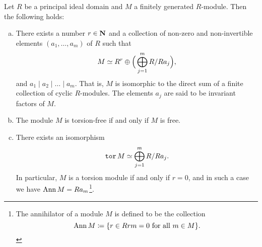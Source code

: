 \begin{theorem}
    \label{thm:fundamental-theorem-of-invariant-factors}
    Let \(R\) be a principal ideal domain and \(M\) a finitely generated
    \(R\)-module. Then the following holds:
    \begin{enumerate}[(a)]\setlength\itemsep{0em}
        \item There exists a number \(r \in \mathbf{N}\) and a collection of non-zero and
              non-invertible elements \((a_1, \dots, a_m)\) of \(R\) such that
              \[
                  M \simeq R^r \oplus \Big( \bigoplus_{j=1}^m R/R a_j \Big),
              \]
              and \(a_1 \mid a_2 \mid \dots \mid a_m\). That is, \(M\) is isomorphic to the
              direct sum of a finite collection of cyclic \(R\)-modules. The elements
              \(a_j\) are said to be invariant factors of \(M\).

        \item The module \(M\) is torsion-free if and only if \(M\) is free.

        \item There exists an isomorphism
              \[
                  \operatorname{\texttt{tor}} M \simeq \bigoplus_{j=1}^m R/Ra_j.
              \]
              In particular, \(M\) is a torsion module if and only if \(r = 0\), and in such
              a case we have \(\operatorname{Ann} M = R a_m\)\footnote{The annihilator of a module \(M\)
                  is defined to be the collection
                  \[
                      \operatorname{Ann} M \coloneq \{r \in R \relax r m = 0 \text{ for all } m \in M\}.
                  \]}.
    \end{enumerate}
\end{theorem}

